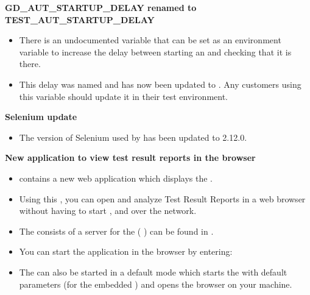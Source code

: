 \textbf{GD\_AUT\_STARTUP\_DELAY renamed to TEST\_AUT\_STARTUP\_DELAY}\\
\begin{itemize}
\item There is an undocumented variable that can be set as an environment variable to increase the delay between starting an \gdaut{} and checking that it is there.
\item This delay was named  and has now been updated to . Any customers using this variable should update it in their test environment. 
\end{itemize}

\textbf{Selenium update}
\begin{itemize}
\item The version of Selenium used by \app{} has been updated to 2.12.0.
\end{itemize}

\textbf{New \dash{} application to view test result reports in the browser}
\begin{itemize}
\item \app{} contains a new web application which displays the \reportpersp{}.
\item Using this \dash{}, you can open and analyze Test Result Reports in a web browser without having to start \app{}, and over the network. 
\item The \dash{} consists of a server for the \dash{} ( ) can be found in . 
\item You can start the application in the browser by entering:\\

\item The \dash{} can also be started in a default mode which starts the  with default parameters (for the embedded \gddb{}) and opens the browser on your machine. 
\end{itemize}

